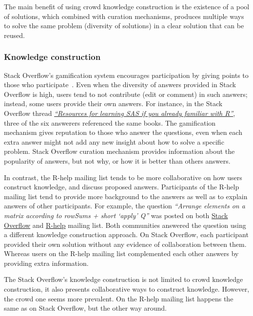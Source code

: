 The main benefit of using crowd knowledge construction is the existence of a pool of solutions, which combined with curation mechanisms, produces multiple ways to solve the same problem (diversity of solutions) in a clear solution that can be reused.

    \subsubsection{Knowledge construction}

    Stack Overflow's gamification system encourages participation by giving points to those who participate~\cite{Singer2013}.
    Even when the diversity of answers provided in Stack Overflow is high, users tend to not contribute (edit or comment) in such answers; instead, some users provide their own answers.
    For instance, in the Stack Overflow thread \textit{\href{http://goo.gl/Mb4Pbk}{``Resources for learning SAS if you already familiar with R''}}, three of the six answerers referenced the same books.
    The gamification mechanism gives reputation to those who answer the questions, even when each extra answer might not add any new insight about how to solve a specific problem.
    Stack Overflow curation mechanism provides information about the popularity of answers, but not why, or how it is better than others answers.

    In contrast, the R-help mailing list tends to be more collaborative on how users construct knowledge, and discuss proposed answers.
    Participants of the R-help mailing list tend to provide more background to the answers as well as to explain answers of other participants.
    For example, the question \textit{``Arrange elements on a matrix according to rowSums + short `apply' Q''} was posted on both \href{http://goo.gl/a8AES8}{Stack Overflow} and \href{http://goo.gl/PGflT5}{R-help} mailing list.
    Both communities answered the question using a different knowledge construction approach.
    On Stack Overflow, each participant provided their own solution without any evidence of collaboration between them.
    Whereas users on the R-help mailing list complemented each other answers by providing extra information.

    The Stack Overflow's knowledge construction is not limited to crowd knowledge construction, it also presents collaborative ways to construct knowledge.
    However, the crowd one seems more prevalent.
    On the R-help mailing list happens the same as on Stack Overflow, but the other way around.


